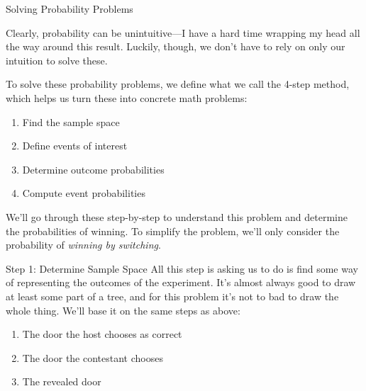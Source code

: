 \documentclass{beamer}
\begin{document}
\begin{frame}{Solving Probability Problems}

Clearly, probability can be unintuitive---I have a hard time wrapping my head all the way around this result. Luckily, though, we don't have to rely on only our intuition to solve these. \vspace{5mm}

To solve these probability problems, we define what we call the \alert{4-step method}, which helps us turn these into concrete math problems:

\begin{enumerate}
    \item Find the sample space
    \item Define events of interest
    \item Determine outcome probabilities
    \item Compute event probabilities
\end{enumerate}

We'll go through these step-by-step to understand this problem and determine the probabilities of winning. To simplify the problem, we'll only consider the probability of \textit{winning by switching}.
\end{frame}

\begin{frame}{Step 1: Determine Sample Space}
    All this step is asking us to do is find some way of representing the outcomes of the experiment. It's almost always good to draw at least some part of a tree, and for this problem it's not to bad to draw the whole thing. We'll base it on the same steps as above:
    \begin{enumerate}
        \item The door the host chooses as correct
        \item The door the contestant chooses
        \item The revealed door
    \end{enumerate}\vspace{5mm}
\end{frame}
\end{document}
